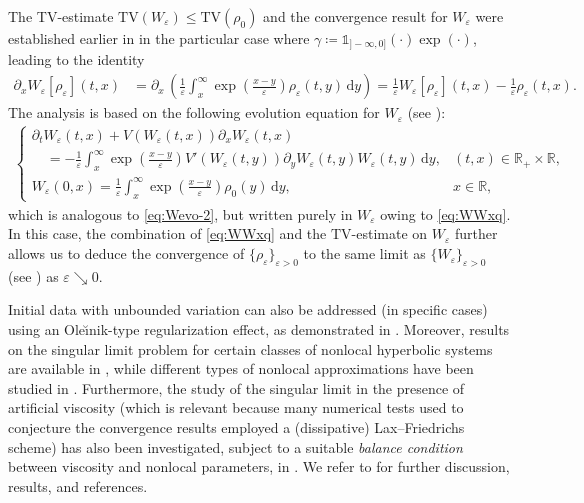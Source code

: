\documentclass[10pt]{amsart}
\theoremstyle{plain}
\theoremstyle{definition}
\numberwithin{equation}{section}
\newcommand{\R}{\mathbb{R}}
\newcommand{\eps}{{\varepsilon}}
\newcommand{\dd}{\,\mathrm{d}}
\begin{document}
The TV-estimate $\mathrm{TV}(W_\varepsilon) \le \mathrm{TV}(\rho_0)$ and the convergence result for $W_\eps$ were established earlier in \cite[Theorems 3.2 and 4.2]{MR4651679} in the particular case where $\gamma \coloneqq \mathds{1}_{]-\infty,0]}(\cdot)\exp(\cdot)$, leading to the identity  
\begin{align}\label{eq:WWxq}
    \partial_{x}W_{\eps}[\rho_{\eps}](t,x)&=\partial_{x}\, \left( \frac{1}{\eps}\int_{x}^{\infty}\exp\left(\frac{x-y}{\eps}\right)\rho_{\eps}(t,y)\dd y \right) =\frac{1}{\eps}W_{\eps}[\rho_{\eps}](t,x)-\frac{1}{\eps}\rho_{\eps}(t,x).
\end{align}
The analysis is based on the following evolution equation for $W_\eps$ (see \cite[Lemma 3.1]{MR4651679}):
\begin{align}\label{eq:Wevo}
\begin{cases}
\partial_t W_\eps(t,x)+V(W_\eps(t,x)) \partial_x W_\eps(t,x) & {}\\
   \displaystyle \quad  =-\frac{1}{\eps}\int_{x}^{\infty}\exp\left(\frac{x-y}{\eps}\right) V'(W_\eps(t,y))\partial_y W_\eps(t,y)W_\eps(t,y)\dd y,  & (t,x) \in \R_+ \times \R,\\
  \displaystyle  W_{\eps}(0,x)=\frac{1}{\eps}\int_{x}^{\infty}\exp\left(\frac{x-y}{\eps}\right)\rho_{0}(y)\dd y, & x\in\R,
   \end{cases}
\end{align}
which is analogous to \cref{eq:Wevo-2}, but written purely in $W_\varepsilon$ owing to \cref{eq:WWxq}.
In this case, the combination of \cref{eq:WWxq} and the \( \mathrm{TV} \)-estimate on $W_{\varepsilon}$ further allows us to deduce the convergence of \( \{\rho_\varepsilon\}_{\varepsilon > 0} \) to the same limit as \( \{W_\varepsilon\}_{\varepsilon > 0} \) (see \cite[Corollary 4.1]{MR4651679}) as $\eps\searrow0$. 

Initial data with unbounded variation can also be addressed (in specific cases) using an Ole\u{\i}nik-type regularization effect, as demonstrated in \cite{MR4855163,MR4656976}. 
Moreover, results on the singular limit problem for certain classes of nonlocal hyperbolic systems are available in \cite{MR4731171,CocDeN24,marconi2025}, while different types of nonlocal approximations have been studied in \cite{MR4857742,MR4720572,MR4638873,ghoshal2025nonconservativenonlocalapproximationburgers}.  
Furthermore, the study of the singular limit in the presence of artificial viscosity (which is relevant because many numerical tests used to conjecture the convergence results employed a (dissipative) Lax--Friedrichs scheme) has also been investigated, subject to a suitable \textit{balance condition} between viscosity and nonlocal parameters, in \cite{MR3961295,MR4340167,zbMATH07315482,MR715133,MR4265719}.
We refer to \cite{colombo2023overviewlocallimitnonlocal,KEIMER2023} for further discussion, results, and references.
\end{document}
